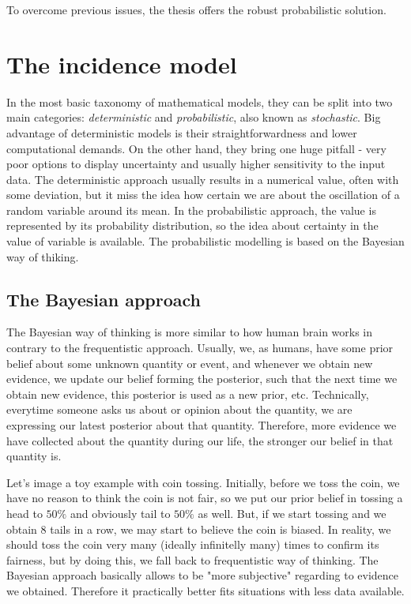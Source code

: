 \documentclass[
  digital, %
  oneside, %
  lof,     %
  lot,     %
]{fithesis4}
\begin{document}
To overcome previous issues, the thesis offers the robust 
probabilistic solution.



\chapter{The incidence model}

In the most basic taxonomy of mathematical models, they can be 
split into two main categories: \textit{deterministic} and 
\textit{probabilistic}, also known as \textit{stochastic}. 
Big advantage of deterministic models is their 
straightforwardness and lower computational demands. 
On the other hand, they bring one huge pitfall - very 
poor options to display uncertainty and usually higher 
sensitivity to the input data. 
The deterministic approach usually results in a numerical 
value, often with some deviation, but it miss the idea 
how certain we are about the oscillation of a random 
variable around its mean. 
In the probabilistic approach, the value is represented 
by its probability distribution, so the idea about 
certainty in the value of variable is available. 
The probabilistic modelling is based on the Bayesian 
way of thiking.

\section{The Bayesian approach}

The Bayesian way of thinking is more similar to how human 
brain works in contrary to the frequentistic approach. 
Usually, we, as humans, have some prior belief about some 
unknown quantity or event, and whenever we obtain new 
evidence, we update our belief forming the posterior, such 
that the next time we obtain new evidence, this posterior 
is used as a new prior, etc. 
Technically, everytime someone asks us about or opinion 
about the quantity, we are expressing our latest posterior 
about that quantity. 
Therefore, more evidence we have collected about the 
quantity during our life, the stronger our belief in 
that quantity is.

Let's image a toy example with coin tossing. 
Initially, before we toss the coin, we have no reason 
to think the coin is not fair, so we put our prior belief 
in tossing a head to $50\%$ and obviously tail to 
$50\%$ as well. 
But, if we start tossing and we obtain 8 tails in a row, 
we may start to believe the coin is biased. 
In reality, we should toss the coin very many (ideally 
infinitelly many) times to confirm its fairness, but 
by doing this, we fall back to frequentistic way of 
thinking. 
The Bayesian approach basically allows to be 
"more subjective" regarding to evidence we obtained. 
Therefore it practically better fits situations with 
less data available.
\end{document}
